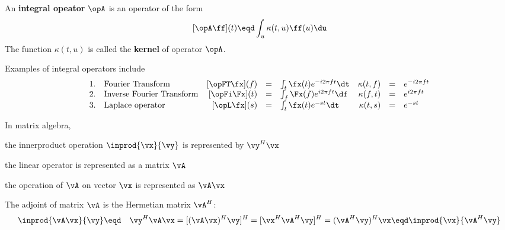 \begin{definition}
An {\bf integral opeator} $\opA$ is an operator of the form
\[ [\opA \ff](t) \eqd \int_u \kappa(t,u) \ff(u) \du \]
The function $\kappa(t,u)$ is called the {\bf kernel} of operator $\opA$.
\end{definition}

Examples of integral operators include
\[
\begin{array}{llrclrcl}
  1. & \mbox{Fourier Transform}
     & [\opFT \fx](f) &=& \int_t \fx(t) e^{-i2\pi ft}\dt 
     & \kappa(t,f)    &=& e^{-i2\pi ft}
\\
  2. & \mbox{Inverse Fourier Transform}
     & [\opFi \Fx](t) &=& \int_f \Fx(f) e^{i2\pi ft}\df 
     & \kappa(f,t)    &=& e^{i2\pi ft}
\\
  3. & \mbox{Laplace operator}
     & [\opL \fx](s) &=& \int_t \fx(t) e^{-st}\dt 
     & \kappa(t,s)   &=& e^{-st}
\end{array}
\]

\begin{example}
In matrix algebra, 
\begin{liste}
  \item the innerproduct operation $\inprod{\vx}{\vy}$ is represented by 
         $\vy^H \vx$ 
  \item the linear operator is represented as a matrix $\vA$ 
  \item the operation of $\vA$ on vector $\vx$ is represented as $\vA\vx$
\end{liste}

The adjoint of matrix $\vA$ is the Hermetian matrix $\vA^H$:
\begin{eqnarray*}
  \inprod{\vA\vx}{\vy}
    &\eqd& \vy^H \vA\vx
     =     [(\vA\vx)^H \vy ]^H
     =     [\vx^H\vA^H \vy ]^H
     =      (\vA^H \vy)^H \vx
     \eqd  \inprod{\vx}{\vA^H \vy}
\end{eqnarray*}
\end{example}

